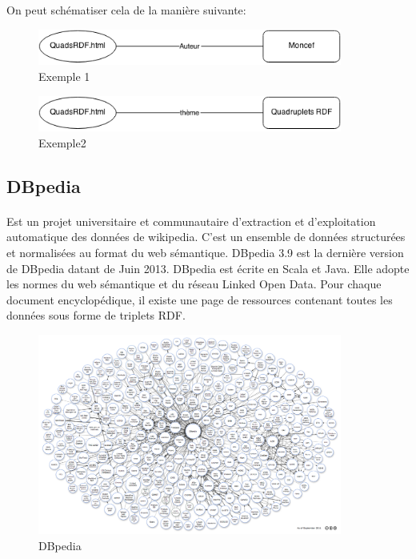 On peut schématiser cela de la manière suivante:
\begin{figure}[H]
        \centering
                \centering
                \includegraphics[width=10cm]{moncef.png}
               \caption{Exemple 1}

\end{figure}
\begin{figure}[H]
        \centering
                \centering
                \includegraphics[width=10cm]{quads.png}
               \caption{Exemple2}

\end{figure}
\subsection*{DBpedia}
\paragraph{}
Est un projet universitaire et communautaire d’extraction et d’exploitation automatique des données de wikipedia. C’est un ensemble de données structurées et normalisées au format du web sémantique.
DBpedia 3.9 est la dernière version de DBpedia datant de Juin 2013. DBpedia est écrite en Scala et Java.
Elle adopte les normes du web sémantique et du réseau Linked Open Data. Pour chaque document encyclopédique, il existe une page de ressources contenant toutes les données sous forme de triplets RDF.
\begin{figure}[H]
        \centering
                \centering
                \includegraphics[width=10cm]{dbpedia.png}
               \caption{DBpedia}

\end{figure}
\newpage
